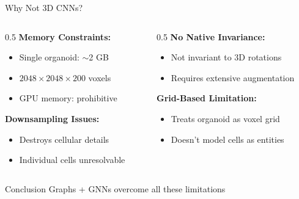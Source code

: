 \documentclass[aspectratio=169]{beamer}
\begin{document}
\begin{frame}{Why Not 3D CNNs?}
    \begin{columns}
        \begin{column}{0.5\textwidth}
            \textbf{Memory Constraints:}
            \begin{itemize}
                \item Single organoid: $\sim$2 GB
                \item $2048 \times 2048 \times 200$ voxels
                \item GPU memory: prohibitive
            \end{itemize}
            
            \vspace{0.5em}
            \textbf{Downsampling Issues:}
            \begin{itemize}
                \item Destroys cellular details
                \item Individual cells unresolvable
            \end{itemize}
        \end{column}
        \begin{column}{0.5\textwidth}
            \textbf{No Native Invariance:}
            \begin{itemize}
                \item Not invariant to 3D rotations
                \item Requires extensive augmentation
            \end{itemize}
            
            \vspace{0.5em}
            \textbf{Grid-Based Limitation:}
            \begin{itemize}
                \item Treats organoid as voxel grid
                \item Doesn't model cells as entities
            \end{itemize}
        \end{column}
    \end{columns}
    
    \vspace{0.5em}
    \begin{alertblock}{Conclusion}
        Graphs + GNNs overcome all these limitations
    \end{alertblock}
\end{frame}
\end{document}
